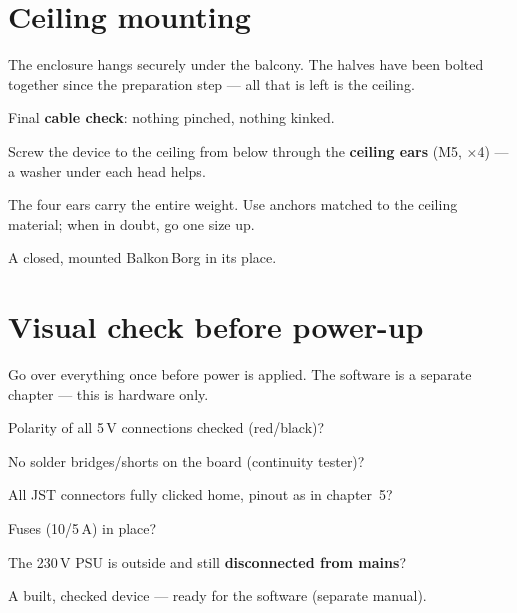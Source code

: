 \section{Ceiling mounting}
\begin{ziel}
The enclosure hangs securely under the balcony. The halves have been bolted together since
the preparation step — all that is left is the ceiling.
\end{ziel}
\begin{schritte}
  \item Final \textbf{cable check}: nothing pinched, nothing kinked.
  \item Screw the device to the ceiling from below through the \textbf{ceiling ears}
        (M5, ×4) — a washer under each head helps.
\end{schritte}
\begin{warum}
The four ears carry the entire weight. Use anchors matched to the ceiling material; when in
doubt, go one size up.
\end{warum}
\begin{ergebnis}
A closed, mounted Balkon\,Borg in its place.
\end{ergebnis}

\clearpage
\section{Visual check before power-up}
\begin{ziel}
Go over everything once before power is applied. The software is a separate chapter — this
is hardware only.
\end{ziel}
\begin{schritte}
  \item Polarity of all 5\,V connections checked (red/black)?
  \item No solder bridges/shorts on the board (continuity tester)?
  \item All JST connectors fully clicked home, pinout as in chapter~5?
  \item Fuses (10/5\,A) in place?
  \item The 230\,V PSU is outside and still \textbf{disconnected from mains}?
\end{schritte}
\begin{ergebnis}
A built, checked device — ready for the software (separate manual).
\end{ergebnis}
